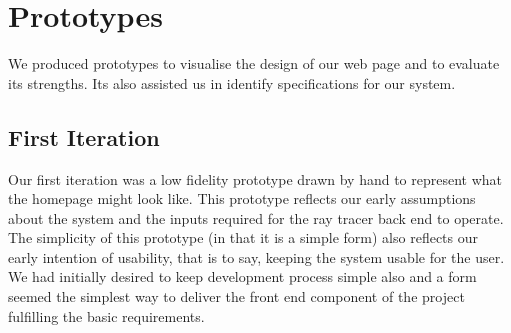 \documentclass[a4paper]{report}
\begin{document}
	
	\section{Prototypes} \label{sec:prototypes}
	We produced prototypes to visualise the design of our web page and to evaluate its strengths. Its also assisted us in identify specifications for our system. 
	
	\subsection{First Iteration}
	
	Our first iteration was a low fidelity prototype drawn by hand to represent what the homepage might look like. This prototype reflects our early assumptions about the system and the inputs required for the ray tracer back end to operate. The simplicity of this prototype (in that it is a simple form) also reflects our early intention of usability, that is to say, keeping the system usable for the user. We had initially desired to keep development process simple also and a form seemed the simplest way to deliver the front end component of the project fulfilling the basic requirements.
	
\end{document}
